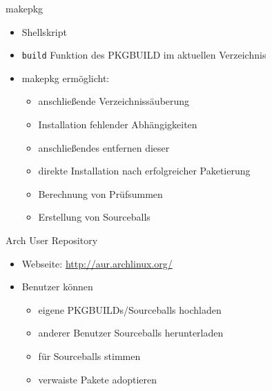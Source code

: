 \begin{slide}{makepkg}
	\begin{itemize}
		\item{Shellskript}
		\item{\texttt{build} Funktion des PKGBUILD im aktuellen Verzeichnis}
		\item{makepkg erm\"{o}glicht:
			\begin{itemize}
				\item{anschließende Verzeichniss\"{a}uberung}
				\item{Installation fehlender Abh\"{a}ngigkeiten}
				\item{anschließendes entfernen dieser}
				\item{direkte Installation nach erfolgreicher Paketierung}
				\item{Berechnung von Pr\"{u}fsummen}
				\item{Erstellung von Sourceballs}
			\end{itemize}
		}
	\end{itemize}
\end{slide}

\begin{slide}{Arch User Repository}
	\begin{itemize}
		\item{Webseite: \url{http://aur.archlinux.org/}}
		\item{Benutzer k\"{o}nnen
			\begin{itemize}
				\item{eigene PKGBUILDs/Sourceballs hochladen}
				\item{anderer Benutzer Sourceballs herunterladen}
				\item{f\"{u}r Sourceballs stimmen}
				\item{verwaiste Pakete adoptieren}
			\end{itemize}
		}
	\end{itemize}
\end{slide}

